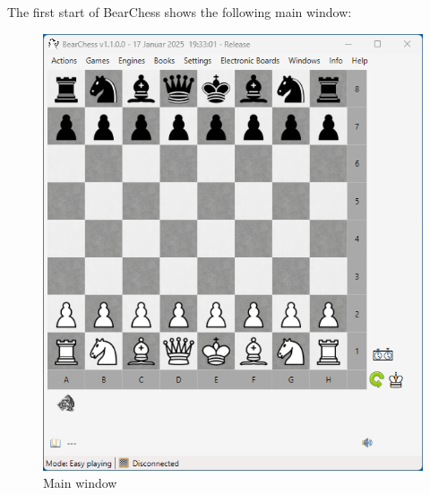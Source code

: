 \documentclass[11pt,a4paper]{article}
\begin{document}
	The first start of BearChess shows the following main window:
	\begin{figure}[H]
		\centering
		\includegraphics[scale=0.7]{BearChess_MainWindow.png}
		\caption{Main window}
		\label{fig:MainWindow}
	\end{figure}
	
\end{document}
